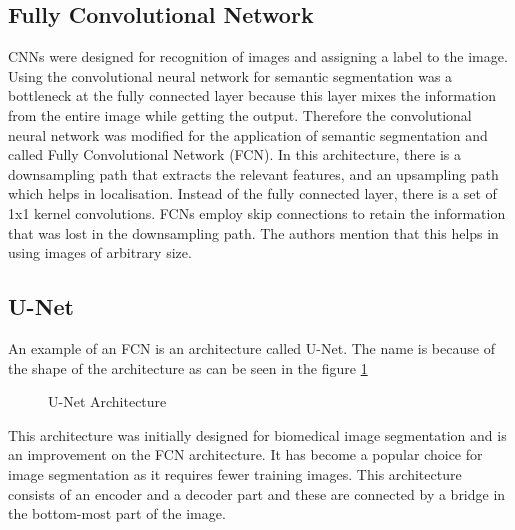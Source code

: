 \documentclass[rnd]{mas_proposal}
\begin{document}
\subsection{Fully Convolutional Network}
CNNs were designed for recognition of images and assigning a label to the image. Using the convolutional neural network for semantic segmentation was a bottleneck at the fully connected layer because this layer mixes the information from the entire image while getting the output. Therefore the convolutional neural network was modified for the application of semantic segmentation and called Fully Convolutional Network (FCN).\cite{FCN-long} In this architecture, there is a downsampling path that extracts the relevant features, and an upsampling path which helps in localisation. Instead of the fully connected layer, there is a set of 1x1 kernel convolutions. FCNs employ skip connections to retain the information that was lost in the downsampling path. The authors mention that this helps in using images of arbitrary size. 

\subsection{U-Net}
An example of an FCN is an architecture called U-Net. The name is because of the shape of the architecture as can be seen in the figure \ref{fig:u-net} 
\begin{figure}[htp] 
        \centering
    \caption{U-Net Architecture \cite{u-net}}%
    \label{fig:u-net}%
\end{figure}

This architecture was initially designed for biomedical image segmentation and is an improvement on the FCN architecture. \cite{u-net} It has become a popular choice for image segmentation as it requires fewer training images. 
This architecture consists of an encoder and a decoder part and these are connected by a bridge in the bottom-most part of the image. 
\end{document}

